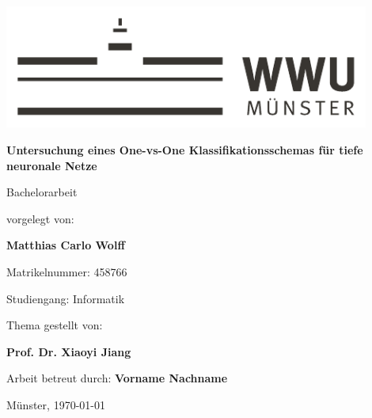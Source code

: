 \begin{centering}
\vspace*{\fill}
\includegraphics[width=12cm]{./img/wwu-logo-neu.pdf}

\vspace{2cm} 

{\LARGE
	\textbf{Untersuchung eines One-vs-One Klassifikationsschemas für tiefe neuronale Netze}\\[1.2cm]
}

{\large
	Bachelorarbeit\\[2cm]
}

{\large
	vorgelegt von:
}

{ \Large
	\textbf{Matthias Carlo Wolff}\\[1cm]
}

{\large
	Matrikelnummer: 458766\\[2mm]
}

{\large
	Studiengang: Informatik\\[1cm]
}
    
{\large
	Thema gestellt von:
}

{\Large
	\textbf{Prof. Dr. Xiaoyi Jiang}\\[1cm]
}
                               
{\large
	Arbeit betreut durch:
}
{\Large
	\textbf{Vorname Nachname}\\[1cm]
}

{\large
Münster, \today
}
\vfill
\end{centering}